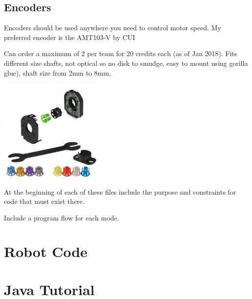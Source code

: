 \documentclass[letterpaper,10pt]{memoir}
\begin{document}
\newpage\section*{Encoders}

Encoders should be used anywhere you need to control motor speed. My preferred encoder is the AMT103-V by CUI

Can order a maximum of 2 per team for 20 credits each (as of Jan 2018). Fits different size shafts, not optical so no disk to smudge, easy to mount using gorilla glue), shaft size from 2mm to 8mm.

\includegraphics[height=2in]{images/encoder-amt103}



At the beginning of each of these files include the purpose and constraints for code that must exist there.

Include a program flow for each mode.





\newpage\chapter{Robot Code}




\newpage\chapter{Java Tutorial}
\end{document}
